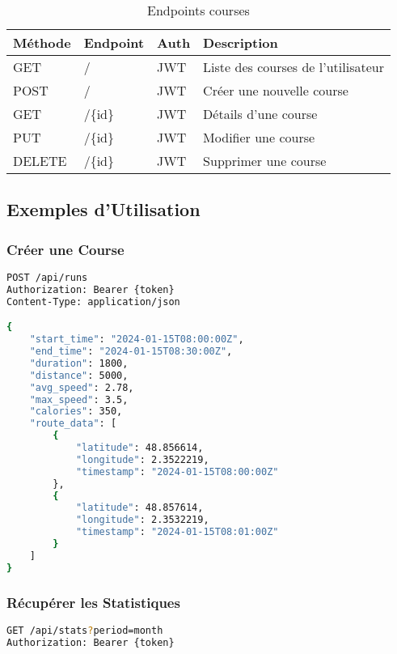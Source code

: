 \begin{table}[H]
\centering
\small
\begin{tabular}{|l|l|l|p{5cm}|}
\hline
\textbf{Méthode} & \textbf{Endpoint} & \textbf{Auth} & \textbf{Description} \\
\hline
GET & / & JWT & Liste des courses de l'utilisateur \\
POST & / & JWT & Créer une nouvelle course \\
GET & /\{id\} & JWT & Détails d'une course \\
PUT & /\{id\} & JWT & Modifier une course \\
DELETE & /\{id\} & JWT & Supprimer une course \\
\hline
\end{tabular}
\caption{Endpoints courses}
\end{table}

\subsection{Exemples d'Utilisation}

\subsubsection{Créer une Course}

\begin{lstlisting}[language=bash]
POST /api/runs
Authorization: Bearer {token}
Content-Type: application/json

{
    "start_time": "2024-01-15T08:00:00Z",
    "end_time": "2024-01-15T08:30:00Z",
    "duration": 1800,
    "distance": 5000,
    "avg_speed": 2.78,
    "max_speed": 3.5,
    "calories": 350,
    "route_data": [
        {
            "latitude": 48.856614,
            "longitude": 2.3522219,
            "timestamp": "2024-01-15T08:00:00Z"
        },
        {
            "latitude": 48.857614,
            "longitude": 2.3532219,
            "timestamp": "2024-01-15T08:01:00Z"
        }
    ]
}
\end{lstlisting}

\subsubsection{Récupérer les Statistiques}

\begin{lstlisting}[language=bash]
GET /api/stats?period=month
Authorization: Bearer {token}
\end{lstlisting}

